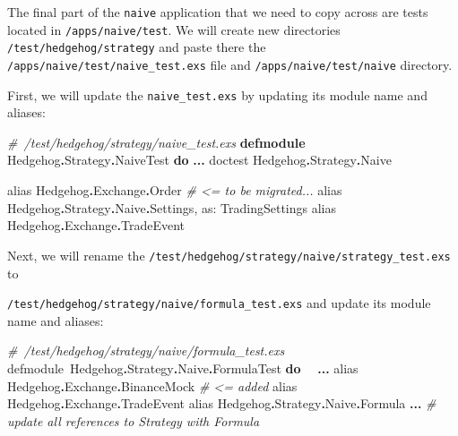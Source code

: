 \documentclass[
  oneside]{book}
\newenvironment{Shaded}{\begin{snugshade}}{\end{snugshade}}
\newcommand{\CommentTok}[1]{\textcolor[rgb]{0.56,0.35,0.01}{\textit{#1}}}
\newcommand{\ConstantTok}[1]{\textcolor[rgb]{0.56,0.35,0.01}{#1}}
\newcommand{\ImportTok}[1]{#1}
\newcommand{\KeywordTok}[1]{\textcolor[rgb]{0.13,0.29,0.53}{\textbf{#1}}}
\newcommand{\NormalTok}[1]{#1}
\newcommand{\OperatorTok}[1]{\textcolor[rgb]{0.81,0.36,0.00}{\textbf{#1}}}
\newcommand{\VariableTok}[1]{\textcolor[rgb]{0.00,0.00,0.00}{#1}}
\begin{document}
The final part of the \texttt{naive} application that we need to copy across are tests located in \texttt{/apps/naive/test}. We will create new directories \texttt{/test/hedgehog/strategy} and paste there the \texttt{/apps/naive/test/naive\_test.exs} file and \texttt{/apps/naive/test/naive} directory.

First, we will update the \texttt{naive\_test.exs} by updating its module name and aliases:

\begin{Shaded}
\begin{Highlighting}[]
\CommentTok{\# /test/hedgehog/strategy/naive\_test.exs}
\KeywordTok{defmodule} \ConstantTok{Hedgehog}\OperatorTok{.}\ConstantTok{Strategy}\OperatorTok{.}\ConstantTok{NaiveTest} \KeywordTok{do}
  \OperatorTok{...}
\NormalTok{  doctest }\ConstantTok{Hedgehog}\OperatorTok{.}\ConstantTok{Strategy}\OperatorTok{.}\ConstantTok{Naive}

  \ImportTok{alias} \ConstantTok{Hedgehog}\OperatorTok{.}\ConstantTok{Exchange}\OperatorTok{.}\ConstantTok{Order} \CommentTok{\# \textless{}= to be migrated...}
  \ImportTok{alias} \ConstantTok{Hedgehog}\OperatorTok{.}\ConstantTok{Strategy}\OperatorTok{.}\ConstantTok{Naive}\OperatorTok{.}\ConstantTok{Settings}\NormalTok{, }\VariableTok{as:} \ConstantTok{TradingSettings}
  \ImportTok{alias} \ConstantTok{Hedgehog}\OperatorTok{.}\ConstantTok{Exchange}\OperatorTok{.}\ConstantTok{TradeEvent}
\end{Highlighting}
\end{Shaded}

Next, we will rename the \texttt{/test/hedgehog/strategy/naive/strategy\_test.exs} to

\texttt{/test/hedgehog/strategy/naive/formula\_test.exs} and update its module name and aliases:

\begin{Shaded}
\begin{Highlighting}[]
\CommentTok{\# /test/hedgehog/strategy/naive/formula\_test.exs}
\NormalTok{defmodule }\ConstantTok{Hedgehog}\OperatorTok{.}\ConstantTok{Strategy}\OperatorTok{.}\ConstantTok{Naive}\OperatorTok{.}\ConstantTok{FormulaTest} \KeywordTok{do}
  \OperatorTok{...}
  \ImportTok{alias} \ConstantTok{Hedgehog}\OperatorTok{.}\ConstantTok{Exchange}\OperatorTok{.}\ConstantTok{BinanceMock}    \CommentTok{\# \textless{}= added}
  \ImportTok{alias} \ConstantTok{Hedgehog}\OperatorTok{.}\ConstantTok{Exchange}\OperatorTok{.}\ConstantTok{TradeEvent}
  \ImportTok{alias} \ConstantTok{Hedgehog}\OperatorTok{.}\ConstantTok{Strategy}\OperatorTok{.}\ConstantTok{Naive}\OperatorTok{.}\ConstantTok{Formula}
  \OperatorTok{...}
  \CommentTok{\# update all references to \textasciigrave{}Strategy\textasciigrave{} with \textasciigrave{}Formula\textasciigrave{}}
\end{Highlighting}
\end{Shaded}
\end{document}
